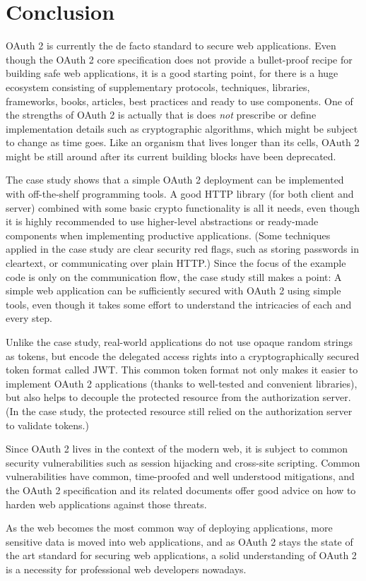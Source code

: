 \section{Conclusion}

OAuth 2 is currently the de facto standard to secure web applications. Even though the OAuth 2 core specification does not provide a bullet-proof recipe for building safe web applications, it is a good starting point, for there is a huge ecosystem consisting of supplementary protocols, techniques, libraries, frameworks, books, articles, best practices and ready to use components. One of the strengths of OAuth 2 is actually that is does \textit{not} prescribe or define implementation details such as cryptographic algorithms, which might be subject to change as time goes. Like an organism that lives longer than its cells, OAuth 2 might be still around after its current building blocks have been deprecated.

The case study shows that a simple OAuth 2 deployment can be implemented with off-the-shelf programming tools. A good HTTP library (for both client and server) combined with some basic crypto functionality is all it needs, even though it is highly recommended to use higher-level abstractions or ready-made components when implementing productive applications. (Some techniques applied in the case study are clear security red flags, such as storing passwords in cleartext, or communicating over plain HTTP.) Since the focus of the example code is only on the communication flow, the case study still makes a point: A simple web application can be sufficiently secured with OAuth 2 using simple tools, even though it takes some effort to understand the intricacies of each and every step.

Unlike the case study, real-world applications do not use opaque random strings as tokens, but encode the delegated access rights into a cryptographically secured token format called JWT. This common token format not only makes it easier to implement OAuth 2 applications (thanks to well-tested and convenient libraries), but also helps to decouple the protected resource from the authorization server. (In the case study, the protected resource still relied on the authorization server to validate tokens.)

Since OAuth 2 lives in the context of the modern web, it is subject to common security vulnerabilities such as session hijacking and cross-site scripting. Common vulnerabilities have common, time-proofed and well understood mitigations, and the OAuth 2 specification and its related documents offer good advice on how to harden web applications against those threats.

As the web becomes the most common way of deploying applications, more sensitive data is moved into web applications, and as OAuth 2 stays the state of the art standard for securing web applications, a solid understanding of OAuth 2 is a necessity for professional web developers nowadays.
